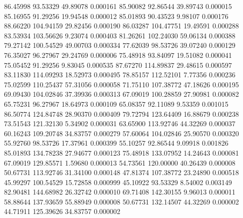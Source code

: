        86.45998       93.53329       49.89078       0.000161
       85.90082       92.86544       39.89743       0.000015
       85.16955       91.29256       19.94548       0.000012
       85.01893       90.43523        9.98107       0.000176
       88.66220      104.94159       29.82456       0.000190
       86.03287      104.47751       19.49591       0.000288
       83.53934      103.56626        9.23074       0.000403
       81.26261      102.24030       59.06134       0.000388
       79.27142      100.54529       49.00703       0.000334
       77.62039       98.53726       39.07240       0.000129
       76.35027       96.27967       29.24769       0.000006
       75.48918       93.84097       19.51082       0.000041
       75.05452       91.29256        9.83045       0.000535
       87.67270      114.89837       29.48615       0.000597
       83.11830      114.09293       18.52973       0.000495
       78.85157      112.52101        7.77356       0.000236
       75.02599      110.25437       57.31056       0.000058
       71.75110      107.38772       47.18626       0.000195
       69.09430      104.02846       37.39936       0.000313
       67.09019      100.28859       27.90981       0.000082
       65.75231       96.27967       18.64973       0.000109
       65.08357       92.11089        9.53359       0.001015
       86.50774      124.84748       28.90370       0.000409
       79.72794      123.64409       16.88679       0.000238
       73.51543      121.32130        5.34902       0.000031
       63.65900      113.92746       44.32269       0.000037
       60.16243      109.20748       34.83757       0.000279
       57.60064      104.02846       25.90570       0.000320
       55.92760       98.53726       17.37961       0.000399
       55.10257       92.86544        9.09918       0.001826
       85.01893      134.78238       27.94677       0.000123
       75.48918      133.07952       14.24643       0.000081
       67.09019      129.85571        1.59680       0.000013
       54.73561      120.00000       40.26439       0.000008
       50.67731      113.92746       31.34100       0.000148
       47.81374      107.38772       23.24890       0.000518
       45.99297      100.54529       15.72858       0.000999
       45.10922       93.53329        8.54002       0.003149
       82.90481      144.68982       26.32742       0.000010
       69.71408      142.30155        9.96013       0.000011
       58.88644      137.93659       55.88949       0.000008
       50.67731      132.14507       44.32269       0.000002
       44.71911      125.39626       34.83757       0.000002
